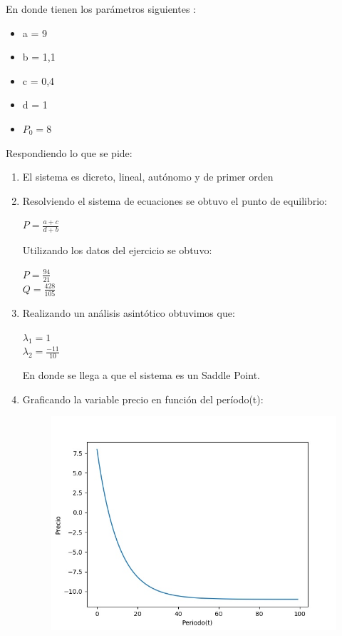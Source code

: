 \documentclass[11pt,a4paper]{article}
\begin{document}
		En donde tienen los parámetros siguientes :
		\begin{itemize}
					\item a = 9
					\item b = 1,1
					\item c = 0,4
					\item d = 1
					\item $P_0 = 8$
		\end{itemize}

		Respondiendo lo que se pide:
		\begin{enumerate}
			\item El sistema es dicreto, lineal, autónomo y de primer orden
			\item Resolviendo el sistema de ecuaciones se obtuvo el punto de equilibrio:
				\begin{center}
					$P = \frac{a+c}{d+b}$
				\end{center}
				Utilizando los datos del ejercicio se obtuvo:
				\begin{center}
					$P = \frac{94}{21}$\\
					\vspace*{0.15in}
					$Q = \frac{428}{105}$
				\end{center}
			
			\item Realizando un análisis asintótico obtuvimos que: 
				\begin{center}
					$\lambda_1 = 1$\\
					\vspace*{0.15in}
					$\lambda_2 = \frac{-11}{10}$
				\end{center}
				En donde se llega a que el sistema es un Saddle Point.
			\item Graficando la variable precio en función del período(t):
				\begin{figure}[H]
  					\centering
    					\includegraphics[width=14cm]{imagenes/precioTiempo}
				\end{figure}


\end{enumerate}
\end{document}
